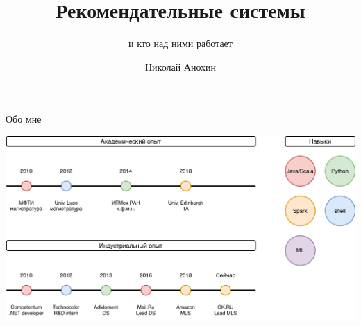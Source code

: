 \documentclass[11pt,aspectratio=169]{beamer}
\author{Николай Анохин}
\title{Рекомендательные системы}
\subtitle{и кто над ними работает}
\begin{document}
{
\begin{frame}[plain]
\end{frame}
}

\begin{frame}{Обо мне}

\begin{center}
\includegraphics[scale=0.23]{images/about-me.png}
\end{center}

\end{frame}
\end{document}
